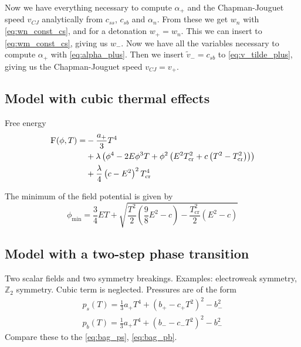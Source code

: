 Now we have everything necessary to compute $\alpha_+$ and the Chapman-Jouguet speed $v_{CJ}$ analytically from $c_{ss}$, $c_{sb}$ and $\alpha_n$.
From these we get $w_n$ with \eqref{eq:wn_const_cs}, and for a detonation $w_+=w_n$.
This we can insert to \eqref{eq:wm_const_cs}, giving us $w_-$.
Now we have all the variables necessary to compute $\alpha_+$ with \eqref{eq:alpha_plus}.
Then we insert $\tilde{v}_- = c_{sb}$ to \eqref{eq:v_tilde_plus}, giving us the Chapman-Jouguet speed $v_{CJ} = v_+$.


\subsection{Model with cubic thermal effects}
Free energy
\cite[eq. 45]{giese_2020}
\begin{align}
\begin{split}
\textsc{F}(\phi, T) =
&- \frac{a_+}{3} T^4 \\
&+ \lambda \left( \phi^4 - 2E\phi^3 T + \phi^2 \left( E^2 T_\text{cr}^2 + c \left( T^2 - T_\text{cr}^2 \right) \right) \right) \\
&+ \frac{\lambda}{4} \left( c - E^2 \right)^2 T_\text{cr}^4
\end{split}
\end{align}

The minimum of the field potential is given by
\cite[eq. 46]{giese_2020}
\begin{equation}
\phi_\text{min} = \frac{3}{4} ET + \sqrt{\frac{T^2}{2}(\frac{9}{8}E^2 - c) - \frac{T_\text{cr}^2}{2} (E^2 - c)}
\end{equation}


\subsection{Model with a two-step phase transition}
Two scalar fields and two symmetry breakings. Examples: electroweak symmetry, $\mathbb{Z}_2$ symmetry.
Cubic term is neglected.
Pressures are of the form
\cite[eq. 47-48]{giese_2020}
\begin{align}
p_s(T) = \frac{1}{3}a_+ T^4 + (b_+ - c_+ T^2)^2 - b_-^2 \\
p_b(T) = \frac{1}{3}a_+ T^4 + (b_- - c_-T^2)^2 - b_-^2
\end{align}
Compare these to the \eqref{eq:bag_ps}, \eqref{eq:bag_pb}.


